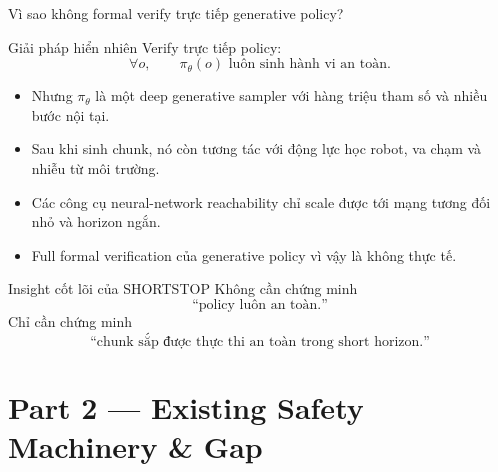 \documentclass[aspectratio=169]{beamer}
\newcommand{\bad}[1]{\textcolor{red!60!black}{#1}}
\begin{document}
\begin{frame}[t,shrink=8]{Vì sao không formal verify trực tiếp generative policy?}

\begin{block}{Giải pháp hiển nhiên}
Verify trực tiếp policy:
\[
\forall o,\qquad
\pi_\theta(o)
\text{ luôn sinh hành vi an toàn}.
\]
\end{block}

\begin{itemize}
    \item Nhưng $\pi_\theta$ là một deep generative sampler với hàng triệu
    tham số và nhiều bước nội tại.

    \item Sau khi sinh chunk, nó còn tương tác với động lực học robot,
    va chạm và nhiễu từ môi trường.

    \item Các công cụ neural-network reachability chỉ scale được tới
    mạng tương đối nhỏ và horizon ngắn.

    \item Full formal verification của generative policy vì vậy là
    \bad{không thực tế}.
\end{itemize}

\vspace{5pt}

\begin{alertblock}{Insight cốt lõi của SHORTSTOP}
Không cần chứng minh
\[
\text{``policy luôn an toàn.''}
\]
Chỉ cần chứng minh
\[
\boxed{
\text{``chunk sắp được thực thi an toàn trong short horizon.''}
}
\]
\end{alertblock}
\end{frame}

\section{Part 2 --- Existing Safety Machinery \& Gap}
\end{document}
